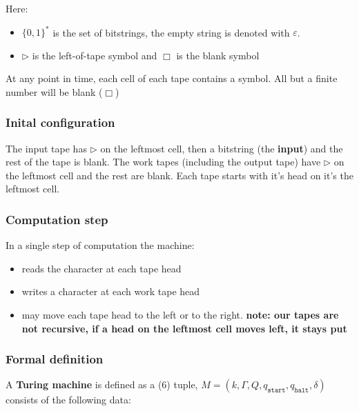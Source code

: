 \documentclass{article}
\begin{document}
Here:

\begin{itemize}
  \item $\{ 0,1 \}^{*} $ is the set of bitstrings, the empty string is denoted with $\varepsilon$.
  \item $\rhd$ is the left-of-tape symbol and $\Box$ is the blank symbol
\end{itemize}

At any point in time, each cell of each tape contains a symbol. All but a finite number will be blank ($\Box$)

\subsubsection{Inital configuration}

The input tape has $\rhd$ on the leftmost cell, then a bitstring (the \textbf{input}) and the rest of the tape is blank. The work tapes (including the output tape) have $\rhd$ on the leftmost cell and the rest are blank.
Each tape starts with it's head on it's the leftmost cell.

\subsubsection{Computation step}

In a single step of computation the machine:

\begin{itemize}
  \item reads the character at each tape head
  \item writes a character at each work tape head
  \item may move each tape head to the left or to the right. \textbf{note: our tapes are not recursive, if a head on the leftmost cell moves left, it stays put}
\end{itemize}

\subsubsection{Formal definition}

A \textbf{Turing machine} is defined as a (6) tuple, $M = (k, \Gamma, Q, q_{\texttt{start}}, q_{\texttt{halt} },\delta )$ consists of the following data:
\end{document}
